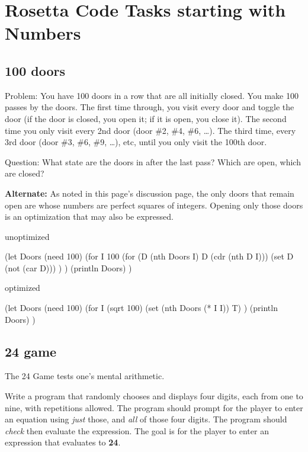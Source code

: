 
%
%
%

\chapter{Rosetta Code Tasks starting with Numbers}
\label{rosettacode-numbers}

\section*{100 doors}

Problem: You have 100 doors in a row that are all initially closed.
You make 100 passes by the doors. The first time through, you visit
every door and toggle the door (if the door is closed, you open it; if
it is open, you close it). The second time you only visit every 2nd
door (door \#2, \#4, \#6, \ldots{}). The third time, every 3rd door
(door \#3, \#6, \#9, \ldots{}), etc, until you only visit the 100th
door.

Question: What state are the doors in after the last pass? Which are
open, which are closed?

\textbf{Alternate:} As noted in this page's discussion page, the only
doors that remain open are whose numbers are perfect squares of
integers. Opening only those doors is an optimization that may also be
expressed.

\begin{wideverbatim}
unoptimized

(let Doors (need 100)
   (for I 100
      (for (D (nth Doors I)  D  (cdr (nth D I)))
         (set D (not (car D))) ) )
   (println Doors) )

optimized

(let Doors (need 100)
   (for I (sqrt 100)
      (set (nth Doors (* I I)) T) )
   (println Doors) )
\end{wideverbatim}

\pagebreak{}
\section*{24 game}

The 24 Game tests one's mental arithmetic.

Write a program that randomly chooses and displays four digits, each
from one to nine, with repetitions allowed. The program should prompt
for the player to enter an equation using \emph{just} those, and
\emph{all} of those four digits. The program should \emph{check} then
evaluate the expression. The goal is for the player to enter an
expression that evaluates to \textbf{24}.

